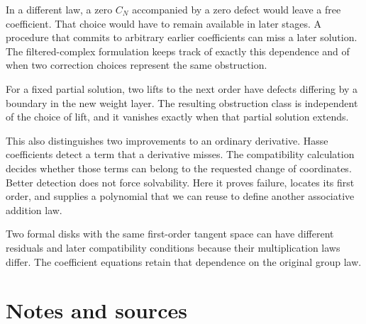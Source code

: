 \documentclass[11pt,letterpaper]{article}
\begin{document}
In a different law, a zero \(
C_N
\) accompanied by a zero defect would leave a free coefficient. That choice would have to remain available in later stages. A procedure that commits to arbitrary earlier coefficients can miss a later solution. The filtered-complex formulation keeps track of exactly this dependence and of when two correction choices represent the same obstruction.

For a fixed partial solution, two lifts to the next order have defects differing by a boundary in the new weight layer. The resulting obstruction class is independent of the choice of lift, and it vanishes exactly when that partial solution extends.

This also distinguishes two improvements to an ordinary derivative. Hasse coefficients detect a term that a derivative misses. The compatibility calculation decides whether those terms can belong to the requested change of coordinates. Better detection does not force solvability. Here it proves failure, locates its first order, and supplies a polynomial that we can reuse to define another associative addition law.

Two formal disks with the same first-order tangent space can have different residuals and later compatibility conditions because their multiplication laws differ. The coefficient equations retain that dependence on the original group law.

\clearpage\section*{Notes and sources}\hypertarget{notes-and-sources}{}
\end{document}
